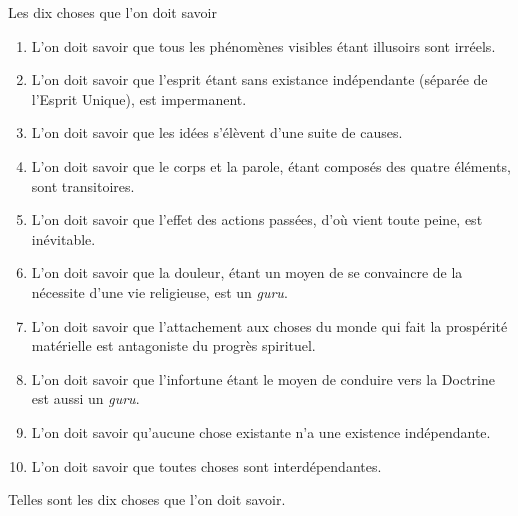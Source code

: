 \documentclass[10pt]{book}
\makeatletter
\renewcommand{\section}{\@startsection{section}{0}{0mm}
   {\baselineskip}
   {\baselineskip}{\normalfont\normalsize\scshape\centering}
}
\makeatother
\begin{document}
\section{Les dix choses que l'on doit savoir}
\begin{enumerate}[1.-]
\item L'on doit savoir que tous les phénomènes visibles étant illusoirs sont irréels.
\item L'on doit savoir que l'esprit étant sans existance indépendante (séparée de l'Esprit Unique), est impermanent.
\item L'on doit savoir que les idées s'élèvent d'une suite de causes.
\item L'on doit savoir que le corps et la parole, étant composés des quatre éléments, sont transitoires.
\item L'on doit savoir que l'effet des actions passées, d'où vient toute peine, est inévitable.
\item L'on doit savoir que la douleur, étant un moyen de se convaincre de la nécessite d'une vie religieuse, est un \textit{guru}.
\item L'on doit savoir que l'attachement aux choses du monde qui fait la prospérité matérielle est antagoniste du progrès spirituel.
\item L'on doit savoir que l'infortune étant le moyen de conduire vers la Doctrine est aussi un \textit{guru}.
\item L'on doit savoir qu'aucune chose existante n'a une existence indépendante.
\item L'on doit savoir que toutes choses sont interdépendantes.
\end{enumerate}
Telles sont les dix choses que l'on doit savoir.
\end{document}
